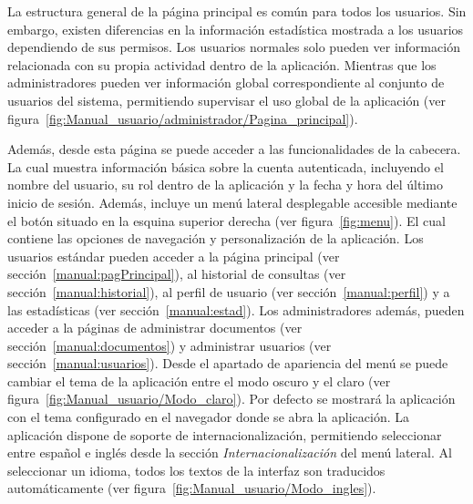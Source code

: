 La estructura general de la página principal es común para todos los usuarios. Sin embargo, existen diferencias en la información estadística mostrada a los usuarios dependiendo de sus permisos. Los usuarios normales solo pueden ver información relacionada con su propia actividad dentro de la aplicación. Mientras que los administradores pueden ver información global correspondiente al conjunto de usuarios del sistema, permitiendo supervisar el uso global de la aplicación (ver figura~\ref{fig:Manual_usuario/administrador/Pagina_principal}).


Además, desde esta página se puede acceder a las funcionalidades de la cabecera. La cual muestra información básica sobre la cuenta autenticada, incluyendo el nombre del usuario, su rol dentro de la aplicación y la fecha y hora del último inicio de sesión. Además, incluye un menú lateral desplegable accesible mediante el botón situado en la esquina superior derecha (ver figura~\ref{fig:menu}). El cual contiene las opciones de navegación y personalización de la aplicación. Los usuarios estándar pueden acceder a la página principal (ver sección~\ref{manual:pagPrincipal}), al historial de consultas (ver sección~\ref{manual:historial}), al perfil de usuario (ver sección~\ref{manual:perfil}) y a las estadísticas (ver sección~\ref{manual:estad}). Los administradores además, pueden acceder a la páginas de administrar documentos (ver sección~\ref{manual:documentos}) y administrar usuarios (ver sección~\ref{manual:usuarios}). Desde el apartado de apariencia del menú se puede cambiar el tema de la aplicación entre el modo oscuro y el claro (ver figura~\ref{fig:Manual_usuario/Modo_claro}). Por defecto se mostrará  la aplicación con el tema configurado en el navegador donde se abra la aplicación. La aplicación dispone de soporte de internacionalización, permitiendo seleccionar entre español e inglés desde la sección \textit{Internacionalización} del menú lateral. Al seleccionar un idioma, todos los textos de la interfaz son traducidos automáticamente (ver figura~\ref{fig:Manual_usuario/Modo_ingles}).

